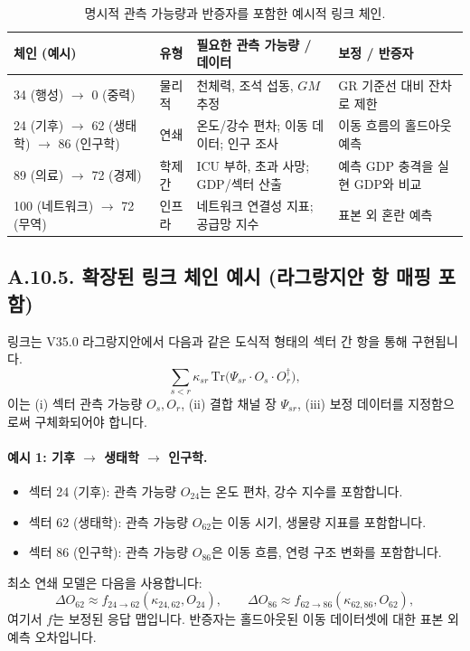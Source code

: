 \documentclass[13pt,a4paper]{article}
\begin{document}
	\begin{table}[htbp]
		\centering
		\small
		\begin{tabular}{p{}p{}p{}p{}}
			\toprule
			\textbf{체인 (예시)} & \textbf{유형} & \textbf{필요한 관측 가능량 / 데이터} & \textbf{보정 / 반증자} \\
			\midrule
			34 (행성) $\to$ 0 (중력) & 물리적 & 천체력, 조석 섭동, $GM$ 추정 & GR 기준선 대비 잔차로 제한 \\
			\midrule
			24 (기후) $\to$ 62 (생태학) $\to$ 86 (인구학) & 연쇄 & 온도/강수 편차; 이동 데이터; 인구 조사 & 이동 흐름의 홀드아웃 예측 \\
			\midrule
			89 (의료) $\to$ 72 (경제) & 학제간 & ICU 부하, 초과 사망; GDP/섹터 산출 & 예측 GDP 충격을 실현 GDP와 비교 \\
			\midrule
			100 (네트워크) $\to$ 72 (무역) & 인프라 & 네트워크 연결성 지표; 공급망 지수 & 표본 외 혼란 예측 \\
			\bottomrule
		\end{tabular}
		\caption{명시적 관측 가능량과 반증자를 포함한 예시적 링크 체인.}
		\label{tab:link-chains-auditable}
	\end{table}
	
	\subsection*{A.10.5. 확장된 링크 체인 예시 (라그랑지안 항 매핑 포함)}
	
	링크는 V35.0 라그랑지안에서 다음과 같은 도식적 형태의 섹터 간 항을 통해 구현됩니다.
	$$
	\sum_{s<r}\kappa_{sr}\,\mathrm{Tr}\!\big(\Psi_{sr}\cdot O_s\cdot O_r^\dagger\big),
	$$
	이는 (i) 섹터 관측 가능량 $O_s,O_r$, (ii) 결합 채널 장 $\Psi_{sr}$, (iii) 보정 데이터를 지정함으로써 구체화되어야 합니다.
	
	\paragraph{예시 1: 기후 $\rightarrow$ 생태학 $\rightarrow$ 인구학.}
	\begin{itemize}[leftmargin=*]
		\item 섹터 24 (기후): 관측 가능량 $O_{24}$는 온도 편차, 강수 지수를 포함합니다.
		\item 섹터 62 (생태학): 관측 가능량 $O_{62}$는 이동 시기, 생물량 지표를 포함합니다.
		\item 섹터 86 (인구학): 관측 가능량 $O_{86}$은 이동 흐름, 연령 구조 변화를 포함합니다.
	\end{itemize}
	최소 연쇄 모델은 다음을 사용합니다:
	$$
	\Delta O_{62}\approx f_{24\to62}(\kappa_{24,62},O_{24}),\qquad
	\Delta O_{86}\approx f_{62\to86}(\kappa_{62,86},O_{62}),
	$$
	여기서 $f$는 보정된 응답 맵입니다. 반증자는 홀드아웃된 이동 데이터셋에 대한 표본 외 예측 오차입니다.
	
\end{document}
